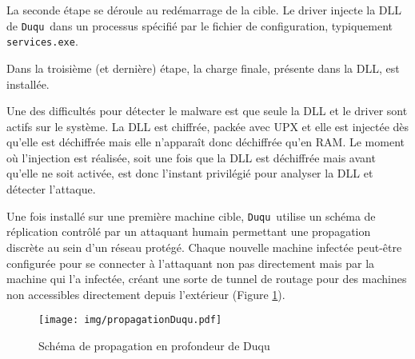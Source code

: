 \documentclass[times,11pt,fullpage]{article}
\newcommand{\Duqu}{\texttt{Duqu}}
\newcommand{\service}{\texttt{services.exe}}
\begin{document}
La seconde étape se déroule au redémarrage de la cible.
Le driver injecte la DLL de \Duqu\ dans un processus spécifié par le fichier de configuration, typiquement \service.

Dans la troisième (et dernière) étape, la charge finale, présente dans la DLL, est installée.

Une des difficultés pour détecter le malware est que seule la DLL et le driver sont actifs sur le système. La DLL est chiffrée, packée avec UPX et elle est injectée dès qu'elle est déchiffrée mais elle n'apparaît donc déchiffrée qu'en RAM. Le moment où l'injection est réalisée, soit une fois que la DLL est déchiffrée mais avant qu'elle ne soit activée, est donc l'instant privilégié pour analyser la DLL et détecter l'attaque.



Une fois installé sur une première machine cible, \Duqu\ utilise un schéma de réplication contrôlé par un attaquant humain permettant une propagation discrète au sein d'un réseau protégé. Chaque nouvelle
machine infectée peut-être configurée pour se connecter à l'attaquant non pas directement mais par la machine qui l'a infectée, créant une sorte de tunnel de routage pour des machines non accessibles directement
depuis l'extérieur (Figure \ref{fig:propagationDuqu}). %

\begin{figure}
\begin{center}
 \texttt{[image: img/propagationDuqu.pdf]}
\end{center}
\caption{Schéma de propagation en profondeur de Duqu}
\label{fig:propagationDuqu}
\end{figure}
\end{document}
